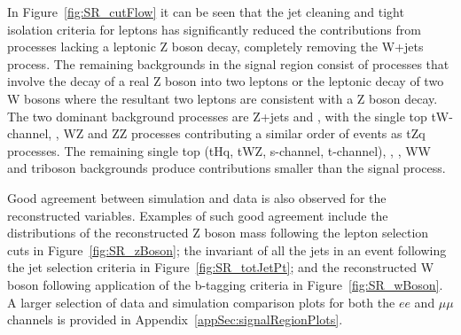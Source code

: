 


In Figure~\ref{fig:SR_cutFlow} it can be seen that the jet cleaning and tight isolation criteria for leptons has significantly reduced the contributions from processes lacking a leptonic Z boson decay, completely removing the W+jets process.
The remaining backgrounds in the signal region consist of processes that involve the decay of a  real Z boson into two leptons or the leptonic decay of two W bosons where the resultant two leptons are consistent with a Z boson decay.
The two dominant background processes are Z+jets and \ttbar, with the single top tW-channel, \ttbarZ, WZ and ZZ processes contributing a similar order of events as tZq processes.
The remaining single top (tHq, tWZ, s-channel, t-channel), \ttbarW, \ttbarH, WW and triboson backgrounds produce contributions smaller than the signal process.

Good agreement between simulation and data is also observed for the reconstructed variables.
Examples of such good agreement include the distributions of the reconstructed Z boson mass following the lepton selection cuts in Figure~\ref{fig:SR_zBoson}; the invariant \pT of all the jets in an event following the jet selection criteria in Figure~\ref{fig:SR_totJetPt}; and the reconstructed W boson following application of the b-tagging criteria in Figure~\ref{fig:SR_wBoson}.
A larger selection of data and simulation comparison plots for both the $ee$ and $\mu\mu$ channels is provided in Appendix~\ref{appSec:signalRegionPlots}.

